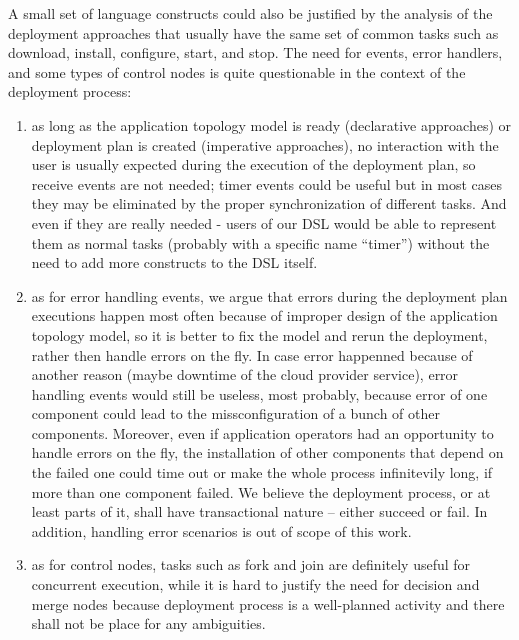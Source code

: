 \noindent 

\noindent A small set of language constructs could also be justified by the analysis of the deployment approaches that usually have the same set of common tasks such as download, install, configure, start, and stop. The need for events, error handlers, and some types of control nodes is quite questionable in the context of the deployment process:

\noindent 

\begin{enumerate}
\item  as long as the application topology model is ready (declarative approaches) or deployment plan is created (imperative approaches), no interaction with the user is usually expected during the execution of the deployment plan, so receive events are not needed; timer events could be useful but in most cases they may be eliminated by the proper synchronization of different tasks. And even if they are really needed - users of our DSL would be able to represent them as normal tasks (probably with a specific name ``timer'') without the need to add more constructs to the DSL itself.

\item  as for error handling events, we argue that errors during the deployment plan executions happen most often because of improper design of the application topology model, so it is better to fix the model and rerun the deployment, rather then handle errors on the fly. In case error happenned because of another reason (maybe downtime of the cloud provider service), error handling events would still be useless, most probably, because error of one component could lead to the missconfiguration of a bunch of other components. Moreover, even if application operators had an opportunity to handle errors on the fly, the installation of other components that depend on the failed one could time out or make the whole process infinitevily long, if more than one component failed. We believe the deployment process, or at least parts of it, shall have transactional nature -- either succeed or fail. In addition, handling error scenarios is out of scope of this work.  

\item  as for control nodes, tasks such as fork and join are definitely useful for concurrent execution, while it is hard to justify the need for decision and merge nodes because deployment process is a well-planned activity and there shall not be place for any ambiguities.


\end{enumerate}
